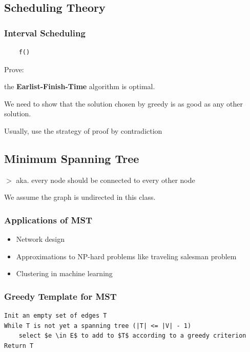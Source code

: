 \documentclass[12pt,a4paper]{article}
\newcommand{\remark}[1]{
    {\small $>$ {\color{blue} #1}}
}
\begin{document}
\subsection*{Scheduling Theory}

\subsubsection{Interval Scheduling}

\begin{verbatim}
    f()
\end{verbatim}

Prove:

the \textbf{Earlist-Finish-Time} algorithm is optimal.

We need to show that the solution chosen by greedy is as good as any other solution.

Usually, use the strategy of proof by contradiction

\subsection*{Minimum Spanning Tree}

\remark{aka. every node should be connected to every other node}

We assume the graph is undirected in this class.

\subsubsection{Applications of MST}

\begin{itemize}
    \item Network design
    \item Approximations to NP-hard problems like traveling salesman problem
    \item Clustering in machine learning
\end{itemize}

\subsubsection{Greedy Template for MST}

\begin{verbatim}
Init an empty set of edges T
While T is not yet a spanning tree (|T| <= |V| - 1) 
    select $e \in E$ to add to $T$ according to a greedy criterion
Return T
\end{verbatim}
\end{document}

